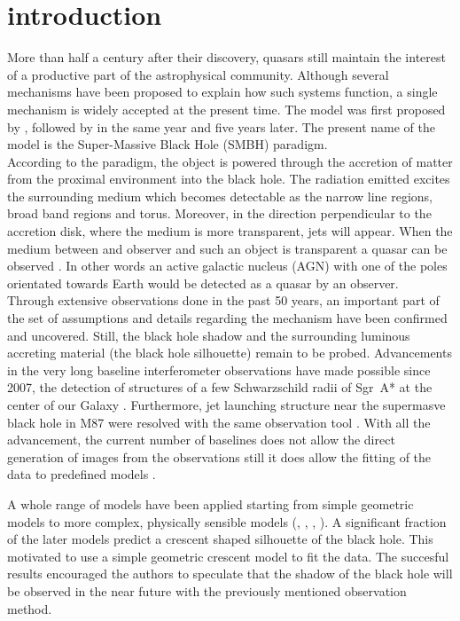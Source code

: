 \section{introduction}
More than half a century after their discovery, quasars still maintain the interest of a productive part of the astrophysical community. 
Although several mechanisms have been proposed to explain how such systems function, a single mechanism is widely accepted at the present time. 
The model was first proposed by \cite{1964ApJ...140..796S}, followed by \cite{1964SPhD....9..246Z} in the same year and \cite{1969Natur.223..690L} five years later.
The present name of the model is the Super-Massive Black Hole (SMBH) paradigm.\\

According to the paradigm, the object is powered through the accretion of matter from the proximal environment into the black hole. 
The radiation emitted excites the surrounding medium which becomes detectable as the narrow line regions, broad band regions and torus. 
Moreover, in the direction perpendicular to the accretion disk, where the medium is more transparent, jets will appear.
When the medium between and observer and such an object is transparent a quasar can be observed \citep[e.g.,][]{1984RvMP...56..255B}. 
In other words an active galactic nucleus (AGN) with one of the poles orientated towards Earth would be detected as a quasar by an observer. \\

Through extensive observations done in the past 50 years, an important part of the set of assumptions and details  regarding the mechanism have been confirmed and uncovered. 
Still, the black hole shadow and the surrounding luminous accreting material (the black hole silhouette) remain to be probed. 
Advancements in the very long baseline interferometer observations have made possible since 2007, the detection of structures of a few Schwarzschild radii of Sgr~A* at the center of our Galaxy \citep{2008JPhCS.131a2055D}. 
Furthermore, jet launching structure near the supermasve black hole in M87 were resolved with the same observation tool \citep{2012Sci...338..355D}.
With all the advancement, the current number of baselines does not allow the direct generation of images from the observations still it does allow the fitting of the data to predefined models \citep{2013MNRAS.434..765K}.


A whole range of models have been applied starting from simple geometric models to more complex, physically sensible models (\cite{2008Natur.455...78D}, \cite{2011ApJ...738...38B}, \cite{2009ApJ...706..497M}, \cite{2010ApJ...717.1092D}). 
A significant fraction of the later models predict a crescent shaped silhouette of the black hole. 
This motivated \cite{2013MNRAS.434..765K} to use a simple geometric crescent model to fit the data. 
The succesful results encouraged the authors to speculate that the shadow of the black hole will be observed in the near future with the previously mentioned observation method. \\


